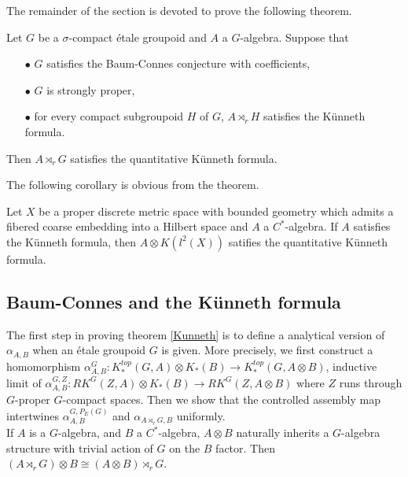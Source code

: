 The remainder of the section is devoted to prove the following theorem.

\begin{thm}\label{Kunneth}
Let $G$ be a $\sigma$-compact étale groupoid and $A$ a $G$-algebra. Suppose that 
\begin{itemize}
\item[$\bullet$] $G$ satisfies the Baum-Connes conjecture with coefficients,
\item[$\bullet$] $G$ is strongly proper,
\item[$\bullet$] for every compact subgroupoid $H$ of $G$, $A\rtimes_r H$ satisfies the Künneth formula.
\end{itemize} 
Then $A\rtimes_r G$ satisfies the quantitative Künneth formula.
\end{thm}

The following corollary is obvious from the theorem.\cite{FinnSellFibred}

\begin{cor}
Let $X$ be a proper discrete metric space with bounded geometry which admits a fibered coarse embedding into a Hilbert space and $A$ a $C^*$-algebra. If $A$ satisfies the Künneth formula, then $A\otimes K(l^2(X))$ satifies the quantitative Künneth formula.
\end{cor}


\subsection{Baum-Connes and the Künneth formula}
The first step in proving theorem \ref{Kunneth} is to define a analytical version of $\alpha_{A,B}$ when an étale groupoid $G$ is given. More precisely, we first construct a homomorphism $\alpha_{A,B}^G : K_*^{top}(G,A)\otimes K_*(B)\rightarrow K_*^{top}(G,A\otimes B )$, inductive limit of $\alpha_{A,B}^{G,Z} : RK^G(Z,A)\otimes K_*(B)\rightarrow RK^G(Z,A\otimes B )$ where $Z$ runs through $G$-proper $G$-compact spaces. Then we show that the controlled assembly map intertwines $\alpha^{G,P_E(G)}_{A,B}$ and $\alpha_{A\rtimes_r G,B}$ uniformly.\\

If $A$ is a $G$-algebra, and $B$ a $C^*$-algebra, $A\otimes B$ naturally inherits a $G$-algebra structure with trivial action of $G$ on the $B$ factor. Then $(A\rtimes_r G)\otimes B \cong (A\otimes B)\rtimes_r G$.\\

